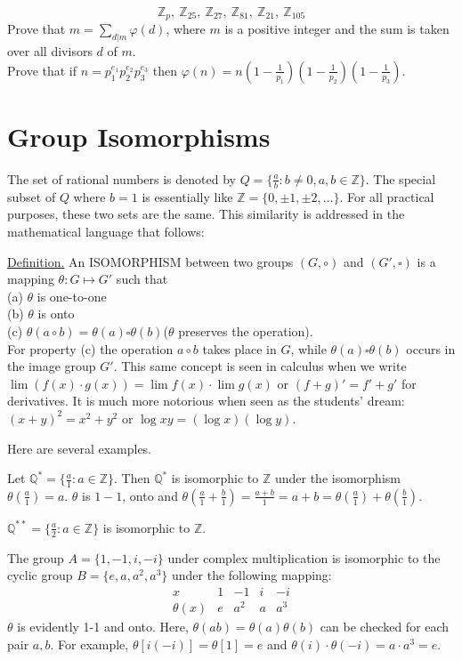 \documentclass[12pt]{book}
\theoremstyle{definition}
\def\Z{\mathbb{Z}}
\begin{document}
$$\mathbb{Z}_p, ~ \mathbb{Z}_{25},~ \mathbb{Z}_{27},~ \mathbb{Z}_{81},~ \mathbb{Z}_{21},~ \mathbb{Z}_{105} $$
Prove that $ m=\sum_{d\vert m}\varphi (d) $, where $ m $ is a positive integer and the sum is taken over all divisors $ d $ of $ m $.
~\\
Prove that if $ n=p^{e_1}_1p_2^{e_2}p_3^{e_3} $ then $ \varphi(n)=n(1-\frac{1}{p_1})(1-\frac{1}{p_2})(1-\frac{1}{p_3}) $.


\section{Group Isomorphisms}
The set of rational numbers is denoted by $Q=\{\frac{a}{b}:b\neq0, a,b \in \Z\}$.  The special subset of $Q$ where $b=1$ is essentially like $\Z=\{0,\pm1,\pm2, \dots\}$.  For all practical purposes, these two sets are the same.  This similarity is addressed in the mathematical language that follows:

\underline{Definition.} An ISOMORPHISM  between two groups $(G,\circ)$ and $(G',\square)$ is a mapping $\theta:G\mapsto G'$ such that\\
(a) $\theta$ is one-to-one\\
(b) $\theta$ is onto\\
(c) $\theta(a\circ b)=\theta(a)\square\theta(b)$\quad($\theta$ preserves the operation).\\
For property (c) the operation $a\circ b$ takes place in $G$, while $\theta(a)\square\theta(b)$ occurs in the image group $G'$.  This same concept is seen in calculus when we write $\lim(f(x)\cdot g(x)) = \lim f(x)\cdot \lim g(x)$ or $(f+g)'=f'+g'$ for derivatives.  It is much more notorious when seen as the students' dream: $(x+y)^2=x^2+y^2$ or $\log xy =(\log x)(\log y)$.

Here are several examples.
\begin{tcexample}{}{}
	 Let $\mathbb{Q}^*=\{\frac{a}{1}:a\in \Z\}$.  Then $\mathbb{Q}^*$ is isomorphic to $\Z$ under the isomorphism $\theta(\frac{a}{1})=a$.  $\theta$ is $1-1$, onto and $\theta(\frac{a}{1}+\frac{b}{1})=\frac{a+b}{1}=a+b=\theta(\frac{a}{1})+\theta(\frac{b}{1})$.
\end{tcexample}

\begin{tcexample}{}{}
	$\mathbb{Q}^{**}=\{\frac{a}{2}:a\in \Z\}$ is isomorphic to $\Z$.
\end{tcexample}

\begin{tcexample}{}{}
	The group $A=\{1,-1,i,-i\}$ under complex multiplication is isomorphic to the cyclic group $B=\{e,a,a^2,a^3\} $ under the following mapping:
	$$\begin{array}{c|cccc}
	x&1&-1&i&-i\\
	\hline
	\theta(x)&e&a^2&a&a^3
	\end{array}$$
	$\theta$ is evidently 1-1 and onto.  Here, $\theta(ab)=\theta(a)\theta(b)$ can be checked for each pair $a,b$.  For example, $\theta[i(-i)]=\theta[1]=e$ and $\theta(i)\cdot\theta(-i)=a\cdot a^3=e$.
\end{tcexample}
\end{document}
